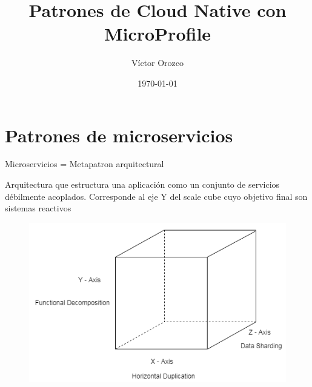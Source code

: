 \documentclass[aspectratio=169]{beamer}
\title{Patrones de Cloud Native con MicroProfile}
\author{Víctor Orozco}
\institute{Nabenik}
\date{\today}
\begin{document}
{
    \frame{\titlepage}
}


{
    \section{Patrones de microservicios}
}


\begin{frame}{Microservicios = Metapatron arquitectural}
	
	Arquitectura que estructura una aplicación como un conjunto de servicios débilmente acoplados. Corresponde al eje Y del scale cube cuyo objetivo final son sistemas reactivos
	
	\begin{figure}
		\centering
		\includegraphics[width=0.6\linewidth]{Images/scale}
	\end{figure}
	
\end{frame}
\end{document}
